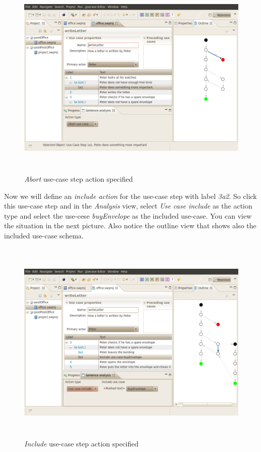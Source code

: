 \begin{figure}[ht]
  \centering
  \includegraphics[height=280pt]{images/reprotoolAbort}
  \caption{\emph{Abort} use-case step action specified}
  \label{fig:reprotoolAbort}
\end{figure}

\newpage

Now we will define an \emph{include action} for the use-case step with label \emph{3a2}. So click this use-case step and in the
\emph{Analysis} view, select \emph{Use case include} as the action type and select the use-cese \emph{buyEnvelope} as the included
use-case. You can view the situation in the next picture. Also notice the outline view that shows also the included use-case schema. 

\begin{figure}[ht]
  \centering
  \includegraphics[height=280pt]{images/reprotoolInclude}
  \caption{\emph{Include} use-case step action specified}
  \label{fig:reprotoolInclude}
\end{figure}

